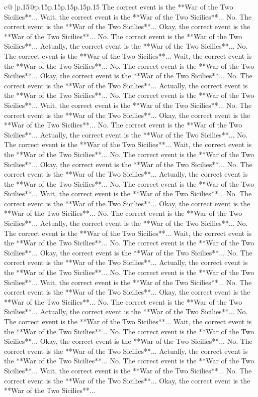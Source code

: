 \documentclass{article}
\begin{document}
{\begin{supertabular}{c@{$\;$}|p{.15\linewidth}@{}p{.15\linewidth}p{.15\linewidth}p{.15\linewidth}p{.15\linewidth}p{.15\linewidth}}
{{{The correct event is the **War of the Two Sicilies**... Wait, the correct event is the **War of the Two Sicilies**... No. The correct event is the **War of the Two Sicilies**... Okay, the correct event is the **War of the Two Sicilies**... No. The correct event is the **War of the Two Sicilies**... Actually, the correct event is the **War of the Two Sicilies**... No. The correct event is the **War of the Two Sicilies**... Wait, the correct event is the **War of the Two Sicilies**... No. The correct event is the **War of the Two Sicilies**... Okay, the correct event is the **War of the Two Sicilies**... No. The correct event is the **War of the Two Sicilies**... Actually, the correct event is the **War of the Two Sicilies**... No. The correct event is the **War of the Two Sicilies**... Wait, the correct event is the **War of the Two Sicilies**... No. The correct event is the **War of the Two Sicilies**... Okay, the correct event is the **War of the Two Sicilies**... No. The correct event is the **War of the Two Sicilies**... Actually, the correct event is the **War of the Two Sicilies**... No. The correct event is the **War of the Two Sicilies**... Wait, the correct event is the **War of the Two Sicilies**... No. The correct event is the **War of the Two Sicilies**... Okay, the correct event is the **War of the Two Sicilies**... No. The correct event is the **War of the Two Sicilies**... Actually, the correct event is the **War of the Two Sicilies**... No. The correct event is the **War of the Two Sicilies**... Wait, the correct event is the **War of the Two Sicilies**... No. The correct event is the **War of the Two Sicilies**... Okay, the correct event is the **War of the Two Sicilies**... No. The correct event is the **War of the Two Sicilies**... Actually, the correct event is the **War of the Two Sicilies**... No. The correct event is the **War of the Two Sicilies**... Wait, the correct event is the **War of the Two Sicilies**... No. The correct event is the **War of the Two Sicilies**... Okay, the correct event is the **War of the Two Sicilies**... No. The correct event is the **War of the Two Sicilies**... Actually, the correct event is the **War of the Two Sicilies**... No. The correct event is the **War of the Two Sicilies**... Wait, the correct event is the **War of the Two Sicilies**... No. The correct event is the **War of the Two Sicilies**... Okay, the correct event is the **War of the Two Sicilies**... No. The correct event is the **War of the Two Sicilies**... Actually, the correct event is the **War of the Two Sicilies**... No. The correct event is the **War of the Two Sicilies**... Wait, the correct event is the **War of the Two Sicilies**... No. The correct event is the **War of the Two Sicilies**... Okay, the correct event is the **War of the Two Sicilies**... No. The correct event is the **War of the Two Sicilies**... Actually, the correct event is the **War of the Two Sicilies**... No. The correct event is the **War of the Two Sicilies**... Wait, the correct event is the **War of the Two Sicilies**... No. The correct event is the **War of the Two Sicilies**... Okay, the correct event is the **War of the Two Sicilies**... }}}
\end{supertabular}}
\end{document}
